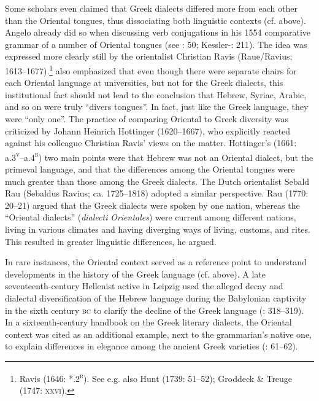 Some scholars even claimed that Greek dialects differed more from each other than the Oriental tongues, thus dissociating both linguistic contexts (cf.  above). Angelo \citet[34]{Canini1554} already did so when discussing verb conjugations in his 1554 comparative grammar of a number of Oriental tongues (see \citealt{Contini1994}: 50; Kessler-\citealt{Mesguich2013}: 211). The idea was expressed more clearly still by the orientalist Christian Ravis (Raue/Ravius; 1613–1677).\footnote{Ravis (1646: *.2\textsc{\textsuperscript{r}}). See e.g. also Hunt (1739: 51–52); Groddeck \& Treuge (1747: \textsc{xxvi}).} \citet[48]{Ravis1650} also emphasized that even though there were separate chairs for each Oriental language at universities, but not for the Greek dialects, this institutional fact should not lead to the conclusion that Hebrew, Syriac, Arabic, and so on were truly “divers tongues”. In fact, just like the Greek language, they were “only one”. The practice of comparing Oriental to Greek diversity was criticized by Johann Heinrich Hottinger (1620–1667), who explicitly reacted against his colleague Christian Ravis’ views on the matter. Hottinger’s (1661: a.3\textsc{\textsuperscript{v}}–a.4\textsc{\textsuperscript{r}}) two main points were that Hebrew was not an Oriental dialect, but the primeval language, and that the differences among the Oriental tongues were much greater than those among the Greek dialects. The Dutch orientalist Sebald Rau (Sebaldus Ravius; ca. 1725–1818) adopted a similar perspective. Rau (1770: 20–21) argued that the Greek dialects were spoken by one nation, whereas the “Oriental dialects” (\textit{dialecti} \textit{Orientales}) were current among different nations, living in various climates and having diverging ways of living, customs, and rites. This resulted in greater linguistic differences, he argued.

In rare instances, the Oriental context served as a reference point to understand developments in the history of the Greek language (cf.  above). A late seventeenth-century Hellenist active in Leipzig used the alleged decay and dialectal diversification of the Hebrew language during the Babylonian captivity in the sixth century \textsc{bc} to clarify the decline of the Greek language (\citealt{Eling1691}: 318–319). In a sixteenth-century handbook on the Greek literary dialects, the Oriental context was cited as an additional example, next to the grammarian’s native one, to explain differences in elegance among the ancient Greek varieties (\citealt{Walper1589}: 61–62).

